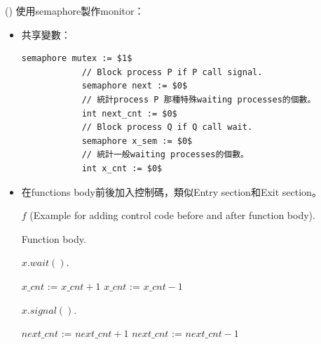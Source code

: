 \begin{theorem}{()} 使用semaphore製作monitor：\begin{itemize}
        \item 共享變數：\begin{lstlisting}[caption={Shared variables of making monitor using semaphore.}, captionpos=b, mathescape=true]
            semaphore mutex := $1$
            // Block process P if P call signal. 
            semaphore next := $0$
            // 統計process P 那種特殊waiting processes的個數。 
            int next_cnt := $0$ 
            // Block process Q if Q call wait.
            semaphore x_sem := $0$ 
            // 統計一般waiting processes的個數。
            int x_cnt := $0$ 
        \end{lstlisting}
        \item 在functions body前後加入控制碼，類似Entry section和Exit section。
        \begin{algorithm}[H]
            \caption{$f$ (Example for adding control code before and after function body).}
            \begin{algorithmic}[1]
                    \State {}
                    \State Function body.
                        \State {}
                    \Else
                        \State {}
                    \EndIf
                \EndFunction
            \end{algorithmic}
        \end{algorithm}
        \begin{algorithm}[H]
            \caption{$x.wait()$.}
            \begin{algorithmic}[1]
                    \State $x\_cnt$ := $x\_cnt + 1$
                        \State {}
                    \Else
                        \State {}
                    \EndIf
                    \State {} 
                    \State $x\_cnt$ := $x\_cnt - 1$ 
                \EndFunction
            \end{algorithmic}
        \end{algorithm}
        \begin{algorithm}[H]
            \caption{$x.signal()$.}
            \begin{algorithmic}[1]
                        \State $next\_cnt$ := $next\_cnt + 1$
                        \State {}
                        \State {} 
                        \State $next\_cnt$ := $next\_cnt - 1$ 
                    \EndIf
                \EndFunction
            \end{algorithmic}
        \end{algorithm}
    \end{itemize}
\end{theorem}

